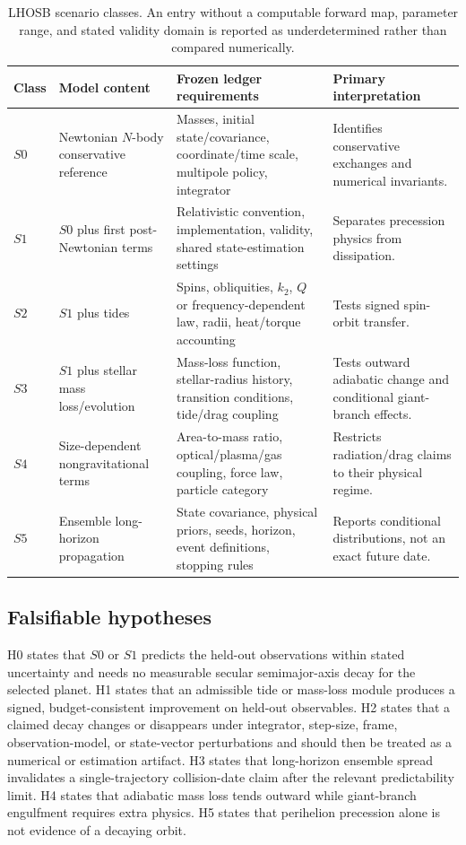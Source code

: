 \documentclass[10pt,conference]{IEEEtran}
\begin{document}
\begin{table}[!t]
\caption{LHOSB scenario classes. An entry without a computable forward map, parameter range, and stated validity domain is reported as underdetermined rather than compared numerically.}
\label{tab:scenario-classes}
\centering
\footnotesize
\setlength{\tabcolsep}{2.5pt}
\begin{tabular}{p{}p{}p{}p{}}
\toprule
Class & Model content & Frozen ledger requirements & Primary interpretation \\
\midrule
$S0$ & Newtonian $N$-body conservative reference & Masses, initial state/covariance, coordinate/time scale, multipole policy, integrator & Identifies conservative exchanges and numerical invariants. \\
$S1$ & $S0$ plus first post-Newtonian terms & Relativistic convention, implementation, validity, shared state-estimation settings & Separates precession physics from dissipation. \\
$S2$ & $S1$ plus tides & Spins, obliquities, $k_2$, $Q$ or frequency-dependent law, radii, heat/torque accounting & Tests signed spin-orbit transfer. \\
$S3$ & $S1$ plus stellar mass loss/evolution & Mass-loss function, stellar-radius history, transition conditions, tide/drag coupling & Tests outward adiabatic change and conditional giant-branch effects. \\
$S4$ & Size-dependent nongravitational terms & Area-to-mass ratio, optical/plasma/gas coupling, force law, particle category & Restricts radiation/drag claims to their physical regime. \\
$S5$ & Ensemble long-horizon propagation & State covariance, physical priors, seeds, horizon, event definitions, stopping rules & Reports conditional distributions, not an exact future date. \\
\bottomrule
\end{tabular}
\end{table}

\subsection{Falsifiable hypotheses}

H0 states that $S0$ or $S1$ predicts the held-out observations within stated uncertainty and needs no measurable secular semimajor-axis decay for the selected planet. H1 states that an admissible tide or mass-loss module produces a signed, budget-consistent improvement on held-out observables. H2 states that a claimed decay changes or disappears under integrator, step-size, frame, observation-model, or state-vector perturbations and should then be treated as a numerical or estimation artifact. H3 states that long-horizon ensemble spread invalidates a single-trajectory collision-date claim after the relevant predictability limit. H4 states that adiabatic mass loss tends outward while giant-branch engulfment requires extra physics. H5 states that perihelion precession alone is not evidence of a decaying orbit.
\end{document}
